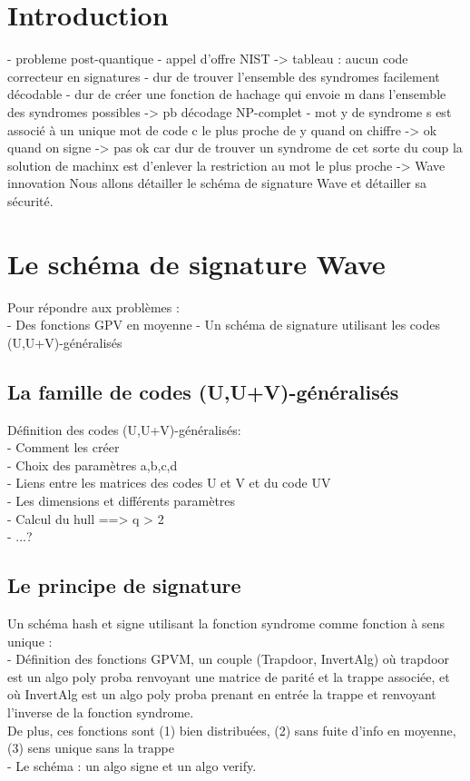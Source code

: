 \documentclass[12pt]{article}
\theoremstyle{definition}
\begin{document}
\section*{Introduction}

- probleme post-quantique
- appel d'offre NIST
	-> tableau : aucun code correcteur en signatures
- dur de trouver l'ensemble des syndromes facilement décodable
- dur de créer une fonction de hachage qui envoie m dans l'ensemble des syndromes possibles
-> pb décodage NP-complet
- mot y de syndrome s est associé à un unique mot de code c le plus proche de y
quand on chiffre -> ok
quand on signe -> pas ok car dur de trouver un syndrome de cet sorte
du coup la solution de machinx est d'enlever la restriction au mot le plus proche
-> Wave innovation 
Nous allons détailler le schéma de signature Wave et détailler sa sécurité.

\section{Le schéma de signature Wave}
Pour répondre aux problèmes : \\
- Des fonctions GPV en moyenne
- Un schéma de signature utilisant les codes (U,U+V)-généralisés

\subsection{La famille de codes (U,U+V)-généralisés}
Définition des codes (U,U+V)-généralisés: \\
- Comment les créer  \\
- Choix des paramètres a,b,c,d \\
- Liens entre les matrices des codes U et V et du code UV \\
- Les dimensions et différents paramètres \\
- Calcul du hull ==> q > 2 \\
- ...? \\

\subsection{Le principe de signature}
Un schéma hash et signe utilisant la fonction syndrome comme fonction à sens unique : \\
- Définition des fonctions GPVM, un couple (Trapdoor, InvertAlg) où trapdoor est un algo poly proba renvoyant une matrice de parité et la trappe associée, et où InvertAlg est un algo poly proba prenant en entrée la trappe et renvoyant l'inverse de la fonction syndrome. \\
De plus, ces fonctions sont (1) bien distribuées, (2) sans fuite d'info en moyenne, (3) sens unique sans la trappe \\
- Le schéma : un algo signe et un algo verify.
\end{document}
